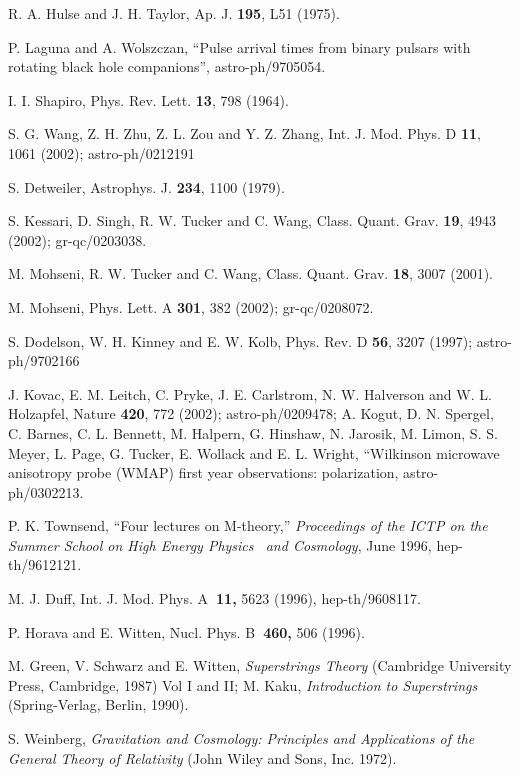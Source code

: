 \documentclass[a4paper,12pt]{article}
\begin{document}
\begin{thebibliography}{99}
  R. A. Hulse and J. H. Taylor, Ap. J. \textbf{195}, L51 (1975).

  P. Laguna and A. Wolszczan, ``Pulse arrival times from binary
pulsars with rotating black hole companions'', astro-ph/9705054.

  I. I. Shapiro, Phys. Rev. Lett. \textbf{13}, 798 (1964).

  S. G. Wang, Z. H. Zhu, Z. L. Zou and Y. Z. Zhang, Int. J. Mod.
Phys. D \textbf{11}, 1061 (2002); astro-ph/0212191

  S. Detweiler, Astrophys. J. \textbf{234}, 1100 (1979).

  S. Kessari, D. Singh, R. W. Tucker and C. Wang, Class. Quant.
Grav. \textbf{19}, 4943 (2002); gr-qc/0203038.

  M. Mohseni, R. W. Tucker and C. Wang, Class. Quant. Grav. 
\textbf{18}, 3007 (2001).

  M. Mohseni, Phys. Lett. A \textbf{301}, 382 (2002);
gr-qc/0208072.

  S. Dodelson, W. H. Kinney and E. W. Kolb, Phys. Rev. D \textbf{%
56}, 3207 (1997); astro-ph/9702166

  J. Kovac, E. M. Leitch, C. Pryke, J. E. Carlstrom, N. W.
Halverson and W. L. Holzapfel, Nature \textbf{420}, 772 (2002);
astro-ph/0209478; A. Kogut, D. N. Spergel, C. Barnes, C. L. Bennett, M.
Halpern, G. Hinshaw, N. Jarosik, M. Limon, S. S. Meyer, L. Page, G. Tucker,
E. Wollack and E. L. Wright, ``Wilkinson microwave anisotropy probe (WMAP)
first year observations: polarization, astro-ph/0302213.

  P. K. Townsend, ``Four lectures on M-theory,'' \textit{%
Proceedings of the ICTP on the Summer School on High Energy Physics \ and
Cosmology}, June 1996, hep-th/9612121.

  M. J. Duff, Int. J. Mod. Phys. A\textbf{\ 11,} 5623 (1996),
hep-th/9608117.

  P. Horava and E. Witten, Nucl. Phys. B\textbf{\ 460,} 506
(1996).

  M. Green, V. Schwarz and E. Witten, \textit{Superstrings Theory%
} (Cambridge University Press, Cambridge, 1987) Vol I and II; M. Kaku, 
\textit{Introduction to Superstrings} (Spring-Verlag, Berlin, 1990).

  S. Weinberg, \textit{Gravitation and Cosmology: Principles and
Applications of the General Theory of Relativity }(John Wiley and Sons, Inc.
1972).


\end{thebibliography}
\end{document}
